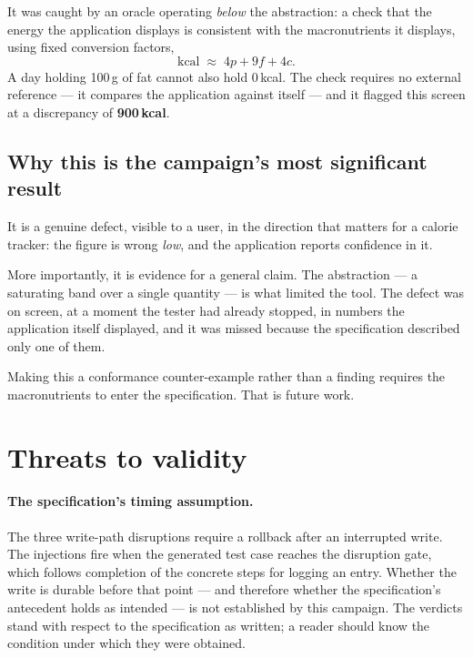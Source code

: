 \documentclass[11pt,a4paper]{article}
\begin{document}
It was caught by an oracle operating \emph{below} the abstraction: a check that
the energy the application displays is consistent with the macronutrients it
displays, using fixed conversion factors,
\[
\mathrm{kcal} \;\approx\; 4p + 9f + 4c .
\]
A day holding 100\,g of fat cannot also hold 0\,kcal. The check requires no
external reference --- it compares the application against itself --- and it
flagged this screen at a discrepancy of \textbf{900\,kcal}.

\subsection*{Why this is the campaign's most significant result}

It is a genuine defect, visible to a user, in the direction that matters for a
calorie tracker: the figure is wrong \emph{low}, and the application reports
confidence in it.

More importantly, it is evidence for a general claim. The abstraction --- a
saturating band over a single quantity --- is what limited the tool. The defect
was on screen, at a moment the tester had already stopped, in numbers the
application itself displayed, and it was missed because the specification
described only one of them.

\medskip
\noindent{}

\medskip
\noindent Making this a conformance counter-example rather than a finding requires
the macronutrients to enter the specification. That is future work.

\section{Threats to validity}
\label{sec:threats}

\paragraph{The specification's timing assumption.}
The three write-path disruptions require a rollback after an interrupted write.
The injections fire when the generated test case reaches the disruption gate,
which follows completion of the concrete steps for logging an entry. Whether the
write is durable before that point --- and therefore whether the specification's
antecedent holds as intended --- is not established by this campaign. The
verdicts stand with respect to the specification as written; a reader should know
the condition under which they were obtained.
\end{document}
